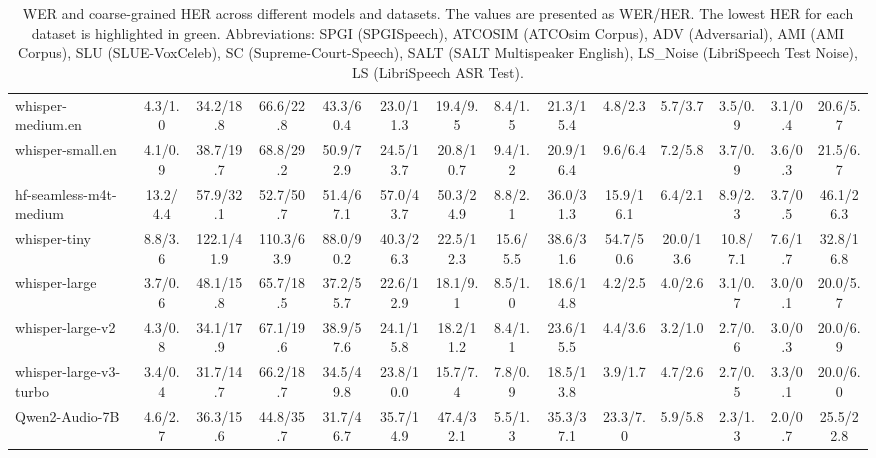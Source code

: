 \begin{table*}[ht!]
{\begin{tabular}{lccccccccccccc}
whisper-medium.en & 4.3/1.0 & 34.2/18.8 & 66.6/22.8 & 43.3/60.4 & 23.0/11.3 & 19.4/9.5 & 8.4/1.5 & 21.3/15.4 & 4.8/2.3 & 5.7/3.7 & 3.5/0.9 & 3.1/0.4 & 20.6/5.7 \\
whisper-small.en & 4.1/0.9 & 38.7/19.7 & 68.8/29.2 & 50.9/72.9 & 24.5/13.7 & 20.8/10.7 & 9.4/1.2 & 20.9/16.4 & 9.6/6.4 & 7.2/5.8 & 3.7/0.9 & 3.6/0.3 & 21.5/6.7 \\ 
hf-seamless-m4t-medium & 13.2/4.4 & 57.9/32.1 & 52.7/50.7 & 51.4/67.1 & 57.0/43.7 & 50.3/24.9 & 8.8/2.1 & 36.0/31.3 & 15.9/16.1 & 6.4/2.1 & 8.9/2.3 & 3.7/0.5 & 46.1/26.3 \\ 
whisper-tiny & 8.8/3.6 & 122.1/41.9 & 110.3/63.9 & 88.0/90.2 & 40.3/26.3 & 22.5/12.3 & 15.6/5.5 & 38.6/31.6 & 54.7/50.6 & 20.0/13.6 & 10.8/7.1 & 7.6/1.7 & 32.8/16.8 \\ 
whisper-large & 3.7/0.6 & 48.1/15.8 & 65.7/18.5 & 37.2/55.7 & 22.6/12.9 & 18.1/9.1 & 8.5/1.0 & 18.6/14.8 & 4.2/2.5 & 4.0/2.6 & 3.1/0.7 & 3.0/0.1 & 20.0/5.7 \\ 
whisper-large-v2 & 4.3/0.8 & 34.1/17.9 & 67.1/19.6 & 38.9/57.6 & 24.1/15.8 & 18.2/11.2 & 8.4/1.1 & 23.6/15.5 & 4.4/3.6 & 3.2/\colorbox[HTML]{8fbc8f}{1.0} & 2.7/0.6 & 3.0/0.3 & 20.0/6.9 \\ 
whisper-large-v3-turbo & 3.4/0.4 & 31.7/14.7 & 66.2/18.7 & 34.5/49.8 & 23.8/10.0 & 15.7/7.4 & 7.8/\colorbox[HTML]{8fbc8f}{0.9} & 18.5/\colorbox[HTML]{8fbc8f}{13.8} & 3.9/\colorbox[HTML]{8fbc8f}{1.7} & 4.7/2.6 & 2.7/0.5 & 3.3/0.1 & 20.0/6.0 \\ 
Qwen2-Audio-7B & 4.6/2.7 & 36.3/15.6 & 44.8/35.7 & 31.7/\colorbox[HTML]{8fbc8f}{46.7 }& 35.7/14.9 & 47.4/32.1 & 5.5/1.3 & 35.3/37.1 & 23.3/7.0 & 5.9/5.8 & 2.3/1.3 & 2.0/0.7 & 25.5/22.8 \\ 
\bottomrule
\end{tabular}%
}
\caption{WER and coarse-grained HER across different models and datasets. The values are presented as WER/HER. The lowest HER for each dataset is highlighted in green. Abbreviations: SPGI (SPGISpeech), ATCOSIM (ATCOsim Corpus), ADV (Adversarial), AMI (AMI Corpus), SLU (SLUE-VoxCeleb), SC (Supreme-Court-Speech), SALT (SALT Multispeaker English), LS\_Noise (LibriSpeech Test Noise), LS (LibriSpeech ASR Test).}
\label{tab:all_results}
\end{table*}